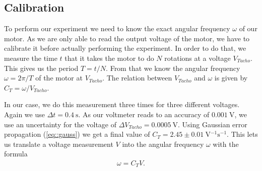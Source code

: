 \subsection{Calibration}

To perform our experiment we need to know the exact angular frequency $\omega$ of our motor.
As we are only able to read the output voltage of the motor, we have to calibrate it before actually performing the experiment.
In order to do that, we measure the time $t$ that it takes the motor to do $N$ rotations at a voltage $V_{Tacho}$.
This gives us the period $T = t/N$.
From that we know the angular frequency  $\omega = 2 \pi/T$  of the motor at $V_{Tacho}$.
The relation between $V_{Tacho}$ and $\omega$ is given by $C_T = \omega/V_{Tacho}$.

In our case, we do this measurement three times for three different voltages.
Again we use $\Delta t = \SI{0.4}{\second}$.
As our voltmeter reads to an accuracy of $\SI{0.001}{\volt}$, we use an uncertainty for the voltage of $\Delta V_{Tacho} = \SI{0.0005}{\volt}$.
Using Gaussian error propagation (\ref{eq::gauss}) we get a final value of $C_T = 2.45 \pm \SI{0.01}{\volt^{-1}\second^{-1}}$.
This lets us translate a voltage measurement $V$ into the angular frequency $\omega$ with the formula 
\begin{align}
	\omega = C_T V.
	\label{eq::calibration}
\end{align}


